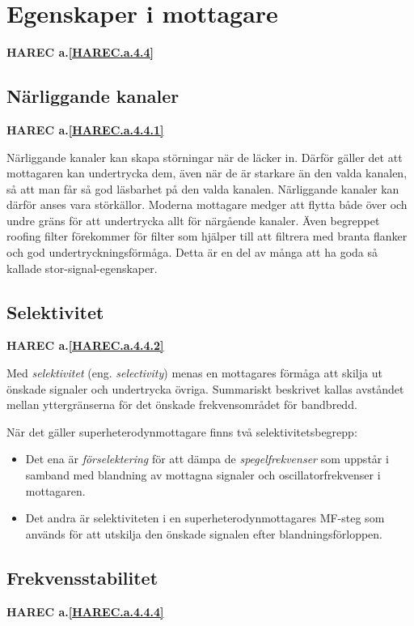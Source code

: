 \section{Egenskaper i mottagare}
\textbf{HAREC a.\ref{HAREC.a.4.4}\label{myHAREC.a.4.4}}

\subsection{Närliggande kanaler}
\textbf{HAREC a.\ref{HAREC.a.4.4.1}\label{myHAREC.a.4.4.1}}

Närliggande kanaler kan skapa störningar när de läcker in.
Därför gäller det att mottagaren kan undertrycka dem, även när de är starkare
än den valda kanalen, så att man får så god läsbarhet på den valda kanalen.
Närliggande kanaler kan därför anses vara störkällor.
Moderna mottagare medger att flytta både över och undre gräns för att
undertrycka allt för närgående kanaler.
Även begreppet roofing filter förekommer för filter som hjälper till att
filtrera med branta flanker och god undertryckningsförmåga.
Detta är en del av många att ha goda så kallade stor-signal-egenskaper.

\subsection{Selektivitet}
\textbf{HAREC a.\ref{HAREC.a.4.4.2}\label{myHAREC.a.4.4.2}}

Med \emph{selektivitet} (eng. \emph{selectivity}) menas en mottagares förmåga
att skilja ut önskade signaler och undertrycka övriga.
Summariskt beskrivet kallas avståndet mellan yttergränserna för det önskade
frekvensområdet för bandbredd.

När det gäller superheterodynmottagare finns två selektivitetsbegrepp:
\begin{itemize}
  \item Det ena är \emph{förselektering} för att dämpa de \emph{spegelfrekvenser} som
uppstår i samband med blandning av mottagna signaler och oscillatorfrekvenser i
mottagaren.
  \item Det andra är selektiviteten i en superheterodynmottagares MF-steg som används
för att utskilja den önskade signalen efter blandningsförloppen.
\end{itemize}

\subsection{Frekvensstabilitet}
\textbf{HAREC a.\ref{HAREC.a.4.4.4}\label{myHAREC.a.4.4.4}}

